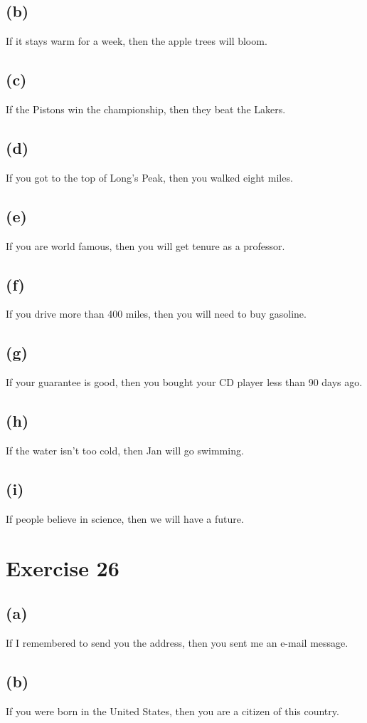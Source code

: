 \documentclass{article}
\begin{document}
	\subsection{(b)}
	If it stays warm for a week, then the apple trees will bloom.
	\subsection{(c)}
	If the Pistons win the championship, then they beat the Lakers.
	\subsection{(d)}
	If you got to the top of Long's Peak, then you walked eight miles.
	\subsection{(e)}
	If you are world famous, then you will get tenure as a professor.
	\subsection{(f)}
	If you drive more than 400 miles, then you will need to buy gasoline.
	\subsection{(g)}
	If your guarantee is good, then you bought your CD player less than 90 days ago.
	\subsection{(h)}
	If the water isn't too cold, then Jan will go swimming.
	\subsection{(i)}
	If people believe in science, then we will have a future.
	
	\pagebreak
	
	\section{Exercise 26}
	\subsection{(a)}
	If I remembered to send you the address, then you sent me an e-mail message.
	\subsection{(b)}
	If you were born in the United States, then you are a citizen of this country.
\end{document}
